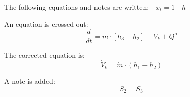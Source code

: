 The following equations and notes are written:  
- \( x_t = 1 \)  
- \( h \)  

An equation is crossed out:  
\[ \frac{d}{dt} = \dot{m} \cdot [h_3 - h_2] - \dot{V}_k + Q^o \]  

The corrected equation is:  
\[ \dot{V}_k = \dot{m} \cdot (h_1 - h_2) \]  

A note is added:  
\[ S_2 = S_3 \]